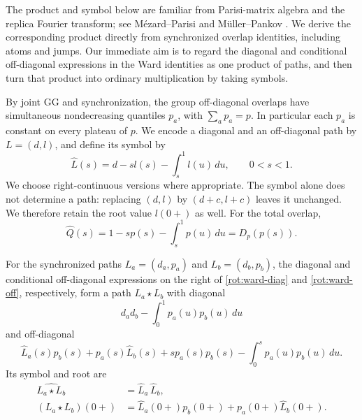 The product and symbol below are familiar from Parisi-matrix algebra and the
replica Fourier transform; see M\'ezard--Parisi
\cite[Appendix~II]{MezardParisi1991} and M\"uller--Pankov
\cite[Appendix~E]{MullerPankov2007}.
We derive the corresponding product directly from synchronized overlap
identities, including atoms and jumps.  Our immediate aim is to regard
the diagonal and conditional off-diagonal expressions in the Ward
identities as one product of paths, and then turn that product into
ordinary multiplication by taking symbols.

By joint GG and synchronization, the group off-diagonal overlaps
have simultaneous nondecreasing quantiles \(p_a\), with
\(\sum_a p_a=p\).  In particular each \(p_a\) is constant on every
plateau of \(p\).  We encode a diagonal and an off-diagonal path by
\(L=(d,l)\), and define its symbol by
\begin{equation}\label{rot:symbol}
 \widehat L(s)=d-sl(s)-\int_s^1 l(u)\,du,\qquad 0<s<1.
\end{equation}
We choose right-continuous versions where appropriate.  The symbol alone
does not determine a path: replacing \((d,l)\) by \((d+c,l+c)\)
leaves it unchanged.  We therefore retain the root value \(l(0+)\)
as well.  For the total overlap,
\[
 \widehat Q(s)=1-sp(s)-\int_s^1p(u)\,du=D_p(p(s)).
\]

\begin{lemma}\label{rot:product}
For the synchronized paths \(L_a=(d_a,p_a)\) and \(L_b=(d_b,p_b)\),
the diagonal and conditional off-diagonal expressions on the right
of \eqref{rot:ward-diag} and \eqref{rot:ward-off}, respectively,
form a path \(L_a\star L_b\) with diagonal
\[
 d_a d_b-\int_0^1p_a(u)p_b(u)\,du
\]
and off-diagonal
\begin{equation}\label{rot:product-path}
 \widehat L_a(s)p_b(s)+p_a(s)\widehat L_b(s)
       +sp_a(s)p_b(s)-\int_0^s p_a(u)p_b(u)\,du.
\end{equation}
Its symbol and root are
\begin{align*}
 \widehat{L_a\star L_b}&=\widehat L_a\,\widehat L_b,\\
 (L_a\star L_b)(0+)
   &=\widehat L_a(0+)p_b(0+)+p_a(0+)\widehat L_b(0+).
\end{align*}
\end{lemma}

